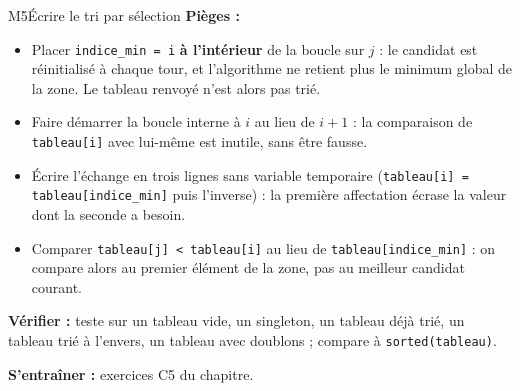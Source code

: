 \begin{fichemethode}{M5}{Écrire le tri par sélection}
\textbf{Pièges :}
\begin{itemize}
  \item Placer \lstinline{indice_min = i} \textbf{à l'intérieur} de la boucle sur $j$ : le
    candidat est réinitialisé à chaque tour, et l'algorithme ne retient plus le minimum
    global de la zone. Le tableau renvoyé n'est alors pas trié.
  \item Faire démarrer la boucle interne à $i$ au lieu de $i+1$ : la comparaison de
    \lstinline{tableau[i]} avec lui-même est inutile, sans être fausse.
  \item Écrire l'échange en trois lignes sans variable temporaire
    (\lstinline{tableau[i] = tableau[indice_min]} puis l'inverse) : la première affectation
    écrase la valeur dont la seconde a besoin.
  \item Comparer \lstinline{tableau[j] < tableau[i]} au lieu de
    \lstinline{tableau[indice_min]} : on compare alors au premier élément de la zone, pas
    au meilleur candidat courant.
\end{itemize}

\textbf{Vérifier :} teste sur un tableau vide, un singleton, un tableau déjà trié, un
tableau trié à l'envers, un tableau avec doublons ; compare à \lstinline{sorted(tableau)}.

\textbf{S'entraîner :} exercices C5 du chapitre.
\end{fichemethode}
